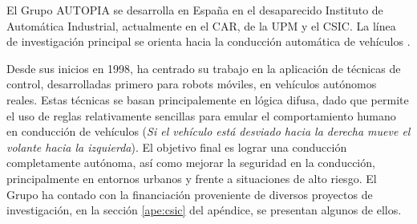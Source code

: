 El Grupo AUTOPIA se desarrolla en España en el desaparecido Instituto de Automática Industrial, actualmente en el \gls{CAR}, de la \gls{UPM} y el \gls{CSIC}. La línea de investigación principal se orienta hacia la conducción automática de vehículos \cite{utopia}. 

Desde sus inicios en 1998, ha centrado su trabajo en  la aplicación de técnicas de control, desarrolladas primero para robots móviles, en vehículos autónomos reales. Estas técnicas se basan principalemente en lógica difusa, dado que permite el uso de reglas relativamente sencillas para emular el comportamiento humano en conducción de vehículos (\textit{Si el vehículo está desviado hacia la derecha mueve el volante hacia la izquierda}).
El objetivo final es lograr una conducción completamente autónoma, así como mejorar la seguridad en la conducción, principalmente en entornos urbanos y frente a situaciones de alto riesgo. El Grupo ha contado con la financiación proveniente de diversos proyectos de investigación, en la sección \ref{ape:csic} del apéndice, se presentan algunos de ellos.

